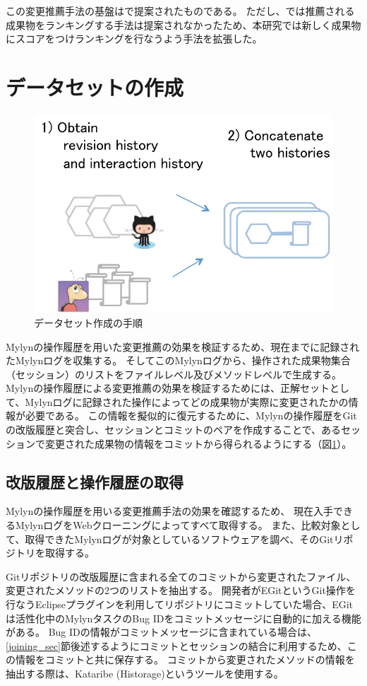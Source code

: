 \documentclass[a4paper]{jsbook}
\begin{document}
この変更推薦手法の基盤は\cite{Zimmermann:2005}で提案されたものである。
ただし、\cite{Zimmermann:2005}では推薦される成果物をランキングする手法は提案されなかったため、本研究では新しく成果物にスコアをつけランキングを行なうよう手法を拡張した。

\section{データセットの作成}\label{data_sec}
\begin{figure}[tb]
  \centering
  \includegraphics[width = 0.5\linewidth]{resource/dataset.pdf}
  \caption{データセット作成の手順}
  \label{dataset}
\end{figure}
Mylynの操作履歴を用いた変更推薦の効果を検証するため、現在までに記録されたMylynログを収集する。
そしてこのMylynログから、操作された成果物集合（セッション）のリストをファイルレベル及びメソッドレベルで生成する。
Mylynの操作履歴による変更推薦の効果を検証するためには、正解セットとして、Mylynログに記録された操作によってどの成果物が実際に変更されたかの情報が必要である。
この情報を擬似的に復元するために、Mylynの操作履歴をGitの改版履歴と突合し、セッションとコミットのペアを作成することで、あるセッションで変更された成果物の情報をコミットから得られるようにする（図\ref{dataset}）。
\subsection{改版履歴と操作履歴の取得}\label{obtainhistory_sec}
Mylynの操作履歴を用いる変更推薦手法の効果を確認するため、
現在入手できるMylynログをWebクローニングによってすべて取得する。
また、比較対象として、取得できたMylynログが対象としているソフトウェアを調べ、そのGitリポジトリを取得する。

Gitリポジトリの改版履歴に含まれる全てのコミットから変更されたファイル、変更されたメソッドの2つのリストを抽出する。
開発者がEGitというGit操作を行なうEclipseプラグインを利用してリポジトリにコミットしていた場合、EGitは活性化中のMylynタスクのBug IDをコミットメッセージに自動的に加える機能がある。
Bug IDの情報がコミットメッセージに含まれている場合は、\ref{joining_sec}節後述するようにコミットとセッションの結合に利用するため、この情報をコミットと共に保存する。
コミットから変更されたメソッドの情報を抽出する際は、Kataribe (Historage)\cite{Hata:2011,Fujiwara:2014}というツールを使用する。
\end{document}
